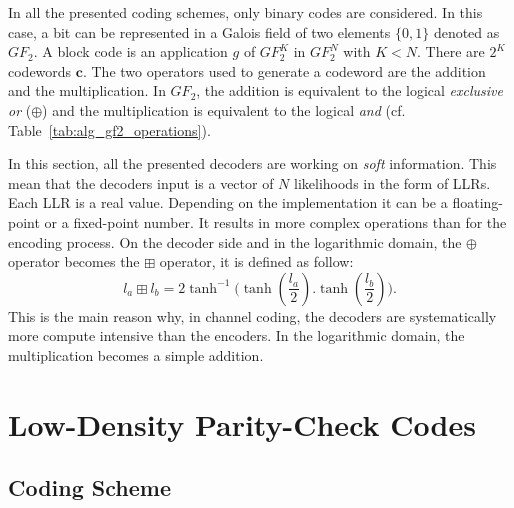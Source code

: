 In all the presented coding schemes, only binary codes are considered. In this
case, a bit can be represented in a Galois field of two elements $\{0, 1\}$
denoted as $GF_2$. A block code is an application $g$ of $GF_2^K$ in $GF_2^N$
with $K < N$. There are $2^K$ codewords $\bm{c}$. The two operators used to
generate a codeword are the addition and the multiplication. In $GF_2$, the
addition is equivalent to the logical \emph{exclusive or} ($\oplus$) and
the multiplication is equivalent to the logical \emph{and} (cf.
Table~\ref{tab:alg_gf2_operations}).

In this section, all the presented decoders are working on \emph{soft}
information. This mean that the decoders input is a vector of $N$ likelihoods in
the form of LLRs. Each LLR is a real value. Depending on the implementation it
can be a floating-point or a fixed-point number. It results in more complex
operations than for the encoding process. On the decoder side and in the
logarithmic domain, the $\oplus$ operator becomes the $\boxplus$ operator, it is
defined as follow:
\begin{equation}
  l_a \boxplus l_b = 2\tanh^{-1}{\big(\tanh{(\frac{l_a}{2}).\tanh{(\frac{l_b}{2})}}\big)}.
\end{equation}
This is the main reason why, in channel coding, the decoders are systematically
more compute intensive than the encoders. In the logarithmic domain, the
multiplication becomes a simple addition.

\section{Low-Density Parity-Check Codes}
\label{sec:alg_ldpc}

\subsection{Coding Scheme}

